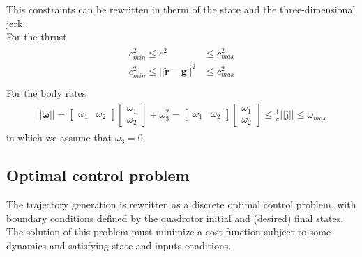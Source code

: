 This constraints can be rewritten in therm of the state and the three-dimensional jerk.\\
For the thrust
\begin{align}
\begin{split}
 c_{min}^2 \leq c^2 &\leq c_{max}^2\\
 c_{min}^2 \leq ||\ddot{\boldsymbol{r}} - \boldsymbol{g}||^2 &\leq c_{max}^2\\
\end{split}
\label{eq:feasib_thrust}
\end{align}
For the body rates
\begin{align}
\begin{split}
||\boldsymbol{\omega}|| =
 {\begin{bmatrix}
\omega_1 & \omega_2
\end{bmatrix}}
 {\begin{bmatrix}
\omega_1 \\[10pt]
\omega_2
\end{bmatrix}} + \omega_3^2 = {\begin{bmatrix}
\omega_1 & \omega_2
\end{bmatrix}}
 {\begin{bmatrix}
\omega_1 \\[10pt]
\omega_2
\end{bmatrix}}  \leq \frac{1}{c}||\boldsymbol{j}||  \leq \omega_{max} 
\end{split}
\label{eq:feasib_bodyrates}
\end{align}
in which we assume that $\omega_3 = 0$
\subsection{Optimal control problem}
The trajectory generation is rewritten as a discrete optimal control problem, with boundary conditions defined by the quadrotor initial and (desired) final states. The solution of this problem must minimize a cost function subject to some dynamics and satisfying state and inputs conditions.\\

